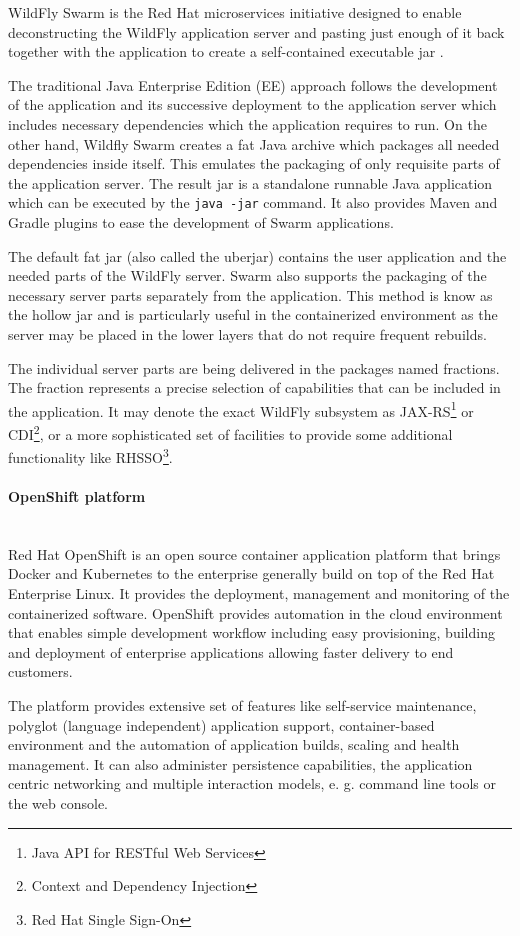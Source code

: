 \documentclass[oneside,
  digital, %
  table,   %
  nolof,     %
  nolot,     %
]{fithesis3}
\newcommand{\newlinepar}[1]{\paragraph{#1}\needspace{4\baselineskip}\mbox{}\\}
\begin{document}
WildFly Swarm is the Red Hat microservices initiative designed to enable deconstructing the WildFly application server and pasting just enough of it back together with the application to create a self-contained executable jar \cite{gupta_2018}. 

The traditional Java Enterprise Edition (EE) approach follows the development of the application and its successive deployment to the application server which includes necessary dependencies which the application requires to run. On the other hand, Wildfly Swarm creates a fat Java archive which packages all needed dependencies inside itself. This emulates the packaging of only requisite parts of the application server. The result jar is a standalone runnable Java application which can be executed by the \texttt{java -jar} command. It also provides Maven and Gradle plugins to ease the development of Swarm applications.

The default fat jar (also called the uberjar) contains the user application and the needed parts of the WildFly server. Swarm also supports the packaging of the necessary server parts separately from the application. This method is know as the hollow jar and is particularly useful in the containerized environment as the server may be placed in the lower layers that do not require frequent rebuilds.

The individual server parts are being delivered in the packages named fractions. The fraction represents a precise selection of capabilities that can be included in the application. It may denote the exact WildFly subsystem as JAX-RS\footnote{Java API for RESTful Web Services} or CDI\footnote{Context and Dependency Injection}, or a more sophisticated set of facilities to provide some additional functionality like RHSSO\footnote{Red Hat Single Sign-On}.

\newlinepar{OpenShift platform}

Red Hat OpenShift is an open source container application platform that  brings Docker and Kubernetes to the enterprise \cite{openshift} generally build on top of the Red Hat Enterprise Linux. It provides the deployment, management and monitoring of the containerized software. OpenShift provides automation in the cloud environment that enables simple development workflow including easy provisioning, building and deployment of enterprise applications allowing faster delivery to end customers.

The platform provides extensive set of features like self-service maintenance, polyglot (language independent) application support, container-based environment and the automation of application builds, scaling and health management. It can also administer persistence capabilities, the application centric networking and multiple interaction models, e. g. command line tools or the web console.
\end{document}
